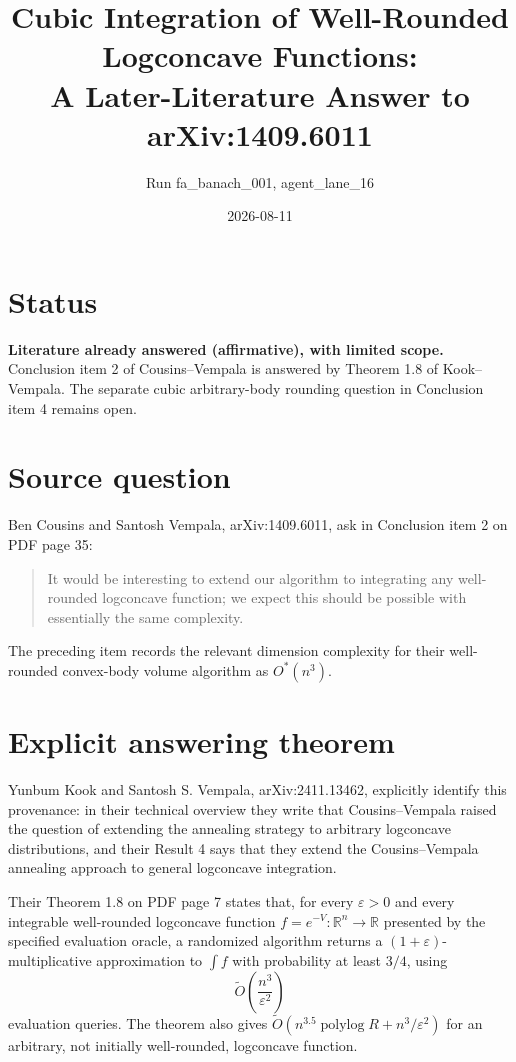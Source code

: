 \documentclass[11pt]{article}
\title{Cubic Integration of Well-Rounded Logconcave Functions:\\
A Later-Literature Answer to arXiv:1409.6011}
\author{Run fa\_banach\_001, agent\_lane\_16}
\date{2026-08-11}
\begin{document}
\maketitle

\section*{Status}

\textbf{Literature already answered (affirmative), with limited scope.}
Conclusion item 2 of Cousins--Vempala is answered by Theorem 1.8 of
Kook--Vempala.  The separate cubic arbitrary-body rounding question in
Conclusion item 4 remains open.

\section*{Source question}

Ben Cousins and Santosh Vempala, arXiv:1409.6011, ask in Conclusion item 2 on
PDF page 35:
\begin{quote}
It would be interesting to extend our algorithm to integrating any
well-rounded logconcave function; we expect this should be possible with
essentially the same complexity.
\end{quote}
The preceding item records the relevant dimension complexity for their
well-rounded convex-body volume algorithm as $O^*(n^3)$.

\section*{Explicit answering theorem}

Yunbum Kook and Santosh S. Vempala, arXiv:2411.13462, explicitly identify
this provenance: in their technical overview they write that
Cousins--Vempala raised the question of extending the annealing strategy to
arbitrary logconcave distributions, and their Result 4 says that they extend
the Cousins--Vempala annealing approach to general logconcave integration.

Their Theorem 1.8 on PDF page 7 states that, for every $\varepsilon>0$ and
every integrable well-rounded logconcave function
$f=e^{-V}:\mathbb R^n\to\mathbb R$ presented by the specified evaluation
oracle, a randomized algorithm returns a $(1+\varepsilon)$-multiplicative
approximation to $\int f$ with probability at least $3/4$, using
\[
  \widetilde O\!\left(\frac{n^3}{\varepsilon^2}\right)
\]
evaluation queries.  The theorem also gives
$\widetilde O(n^{3.5}\operatorname{polylog}R+n^3/\varepsilon^2)$ for an
arbitrary, not initially well-rounded, logconcave function.
\end{document}
